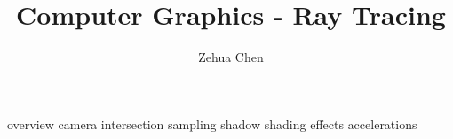 \documentclass[letterpaper, 11pt]{report}
\title{Computer Graphics - Ray Tracing}
\author{Zehua Chen}
\begin{document}
  \maketitle
  \tableofcontents

  \setmainstyles

  {overview}
  {camera}
  {intersection}
  {sampling}
  {shadow}
  {shading}
  {effects}
  {accelerations}

  \newpage
  \printglossary
\end{document}
